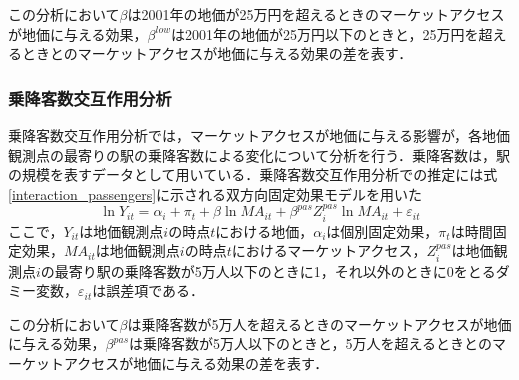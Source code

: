 この分析において$\beta$は2001年の地価が25万円を超えるときのマーケットアクセスが地価に与える効果，$\beta^{low}$は2001年の地価が25万円以下のときと，25万円を超えるときとのマーケットアクセスが地価に与える効果の差を表す．
\subsubsection{乗降客数交互作用分析}
乗降客数交互作用分析では，マーケットアクセスが地価に与える影響が，各地価観測点の最寄りの駅の乗降客数による変化について分析を行う．乗降客数は，駅の規模を表すデータとして用いている．乗降客数交互作用分析での推定には式\ref{interaction_passengers}に示される双方向固定効果モデルを用いた
\begin{equation}
  \ln{Y_{it}} = \alpha_{i} + \pi_{t} + \beta\ln{MA_{it}} + \beta^{pas}Z^{pas}_{i}\ln{MA_{it}} + \varepsilon_{it}
  \label{interaction_passengers}
\end{equation}
ここで，$Y_{it}$は地価観測点$i$の時点$t$における地価，$\alpha_{i}$は個別固定効果，$\pi_{t}$は時間固定効果，$MA_{it}$は地価観測点$i$の時点$t$におけるマーケットアクセス，$Z^{pas}_{i}$は地価観測点$i$の最寄り駅の乗降客数が5万人以下のときに1，それ以外のときに0をとるダミー変数，$\varepsilon_{it}$は誤差項である．

この分析において$\beta$は乗降客数が5万人を超えるときのマーケットアクセスが地価に与える効果，$\beta^{pas}$は乗降客数が5万人以下のときと，5万人を超えるときとのマーケットアクセスが地価に与える効果の差を表す．

